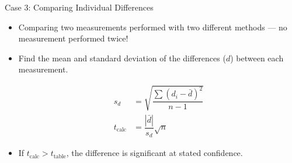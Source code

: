 \documentclass[notes=show]{beamer}
\begin{document}
\begin{frame}{Case 3: Comparing Individual Differences}
	\begin{itemize}
		\item Comparing two measurements performed with two different
			methods --- no measurement performed twice!
		\item Find the mean and standard deviation of the
			\alert{differences} ($d$) between each measurement.

			\begin{align*}
				s_d & = \sqrt{\dfrac{\sum(d_i -
				\bar{d})^2}{n-1}} \\
				t_{\text{calc}} &= \dfrac{|\bar{d}|}{s_d}
				\sqrt{n}
			\end{align*}

		\item If $t_{\text{calc}} > t_{\text{table}}$, the difference is
			significant at stated confidence.
	\end{itemize}
\end{frame}
\end{document}
